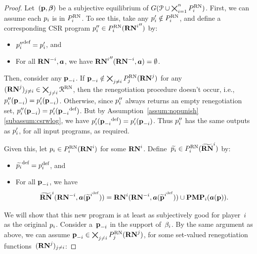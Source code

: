 \documentclass[sigconf]{aamas}
\theoremstyle{definition}
\begin{document}
\pmmguarantee*

\begin{proof}
Let~$(\textbf{p}, \boldsymbol{\beta})$
be a subjective equilibrium
of $G(\mathcal{P} \cup \bigtimes_{i=1}^{{n}} P_i^{\textnormal{RN}})$.
First, we can assume each $p_i$ is in $P_i^{\textnormal{RN}}$.
To see this, take any $p_i' \notin P_i^{\textnormal{RN}}$,
and define a corresponding
CSR program $p_i'' \in P_i^{\textnormal{RN}}({\mathbf{RN}^{i}}'')$ by:
\begin{itemize}
    \item ${p_i''}^{\textnormal{def}} = p_i'$, and
    \item For all ${\mathbf{RN}^{-i}}, \boldsymbol{a}$, we have ${\mathbf{RN}^{i}}''({\mathbf{RN}^{-i}}, \boldsymbol{a}) = \emptyset$.
\end{itemize}
Then, consider any $\textbf{p}_{-i}$. If $\textbf{p}_{-i} \notin \bigtimes_{j \neq i} P_j^{\textnormal{RN}}(\mathbf{RN}^{j})$ for any $(\mathbf{RN}^{j})_{j\neq i} \in \bigtimes_{j \neq i} \mathcal{R}^{\textnormal{RN}}$, then
the renegotiation procedure doesn't
occur,
i.e., $p_i''(\textbf{p}_{-i}) = p_i'(\textbf{p}_{-i})$.
Otherwise, since $p_i''$ always 
returns an empty renegotiation set,
$p_i''(\textbf{p}_{-i}) = p_i'({\textbf{p}_{-i}}^{\textnormal{def}})$. But by
Assumption~\ref{assum:nopunish}\ref{subassum:csrwlog},
we have $p_i'({\textbf{p}_{-i}}^{\textnormal{def}}) = p_i'(\textbf{p}_{-i})$.
Thus $p_i''$ has the same outputs as $p_i'$, for all input programs, as required.

Given this, 
let
$p_i \in P_i^{\textnormal{RN}}(\mathbf{RN}^{i})$
for some $\mathbf{RN}^{i}$.
Define~$\widetilde{p_i} \in P_i^{\textnormal{RN}}({\widetilde{\mathbf{RN}}}^{i})$
by:
\begin{itemize}
    \item 
    ${\widetilde{p_i}}^{\textnormal{def}} = p_i^{\textnormal{def}}$, and
    \item
    For all $\textbf{p}_{-i}$,
    we have
    $${\widetilde{\mathbf{RN}}}^{i}(\mathbf{RN}^{-i}, \boldsymbol{a}({\widetilde{\textbf{p}}^{i^{\textnormal{def}}}})) = \mathbf{RN}^{i}(\mathbf{RN}^{-i}, \boldsymbol{a}({\widetilde{\textbf{p}}^{i^{\textnormal{def}}}})) \cup 
    \mathbf{PMP}_i(\boldsymbol{a}(\textbf{p})).
    $$
\end{itemize}
We will show
that this new program
is at least as subjectively good for player~$i$
as the original $p_i$.
Consider a~$\textbf{p}_{-i}$ in the support of~$\beta_i$. By the same argument as above,
we can assume $\textbf{p}_{-i} \in \bigtimes_{j \neq i} P_j^{\textnormal{RN}}(\mathbf{RN}^{j})$,
for some set-valued renegotiation functions~$(\mathbf{RN}^{j})_{j \neq i}$:


\end{proof}
\end{document}

